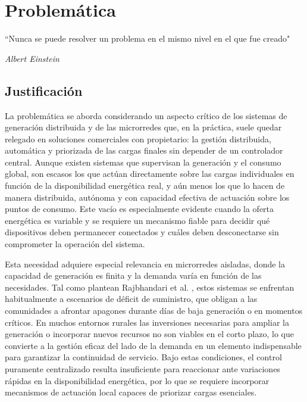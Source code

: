 \cleardoublepage                                 
\chapter{Problemática}
\epigraph{``Nunca se puede resolver un problema en el mismo nivel en el que fue creado"}
{\textit{Albert Einstein}}
\section{Justificación}
La problemática se aborda considerando un aspecto crítico de los sistemas de generación distribuida y de las microrredes que, en la práctica, suele quedar relegado en soluciones comerciales con  propietario: la gestión distribuida, automática y priorizada de las cargas finales sin depender de un controlador central. Aunque existen sistemas que supervisan la generación y el consumo global, son escasos los que actúan directamente sobre las cargas individuales en función de la disponibilidad energética real, y aún menos los que lo hacen de manera distribuida, autónoma y con capacidad efectiva de actuación sobre los puntos de consumo. Este vacío es especialmente evidente cuando la oferta energética es variable y se requiere un mecanismo fiable para decidir qué dispositivos deben permanecer conectados y cuáles deben desconectarse sin comprometer la operación del sistema.

Esta necesidad adquiere especial relevancia en microrredes aisladas, donde la capacidad de generación es finita y la demanda varía en función de las necesidades. Tal como plantean Rajbhandari et al. \cite{rajbhandari2024enhanced}, estos sistemas se enfrentan habitualmente a escenarios de déficit de suministro, que obligan a las comunidades a afrontar apagones durante días de baja generación o en momentos críticos. En muchos entornos rurales las inversiones necesarias para ampliar la generación o incorporar nuevos recursos no son viables en el corto plazo, lo que convierte a la gestión eficaz del lado de la demanda en un elemento indispensable para garantizar la continuidad de servicio. Bajo estas condiciones, el control puramente centralizado resulta insuficiente para reaccionar ante variaciones rápidas en la disponibilidad energética, por lo que se requiere incorporar mecanismos de actuación local capaces de priorizar cargas esenciales.

